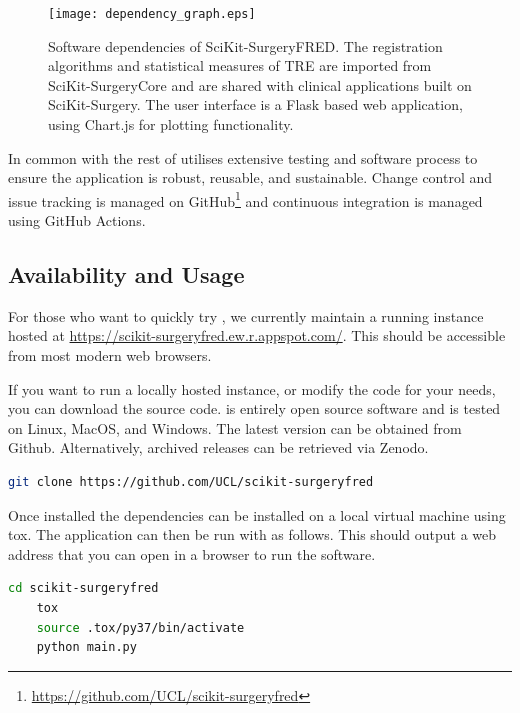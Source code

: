 \begin{figure}
	\begin{center}
	\texttt{[image: dependency\_graph.eps]}
		\caption{\label{fig:dependencies}Software dependencies of SciKit-SurgeryFRED. The registration algorithms and statistical measures of {TRE} are imported from SciKit-SurgeryCore and are shared with clinical applications built on SciKit-Surgery. The user interface is a Flask based web application, using Chart.js for plotting functionality.}
	\end{center}
\end{figure}

In common with the rest of \sksurgery \fred utilises extensive testing and software process \cite{1398621} to 
ensure the application is robust, reusable, and sustainable\cite{VENTERS2018174}. Change control and issue tracking is managed
on GitHub\footnote{\href{https://github.com/UCL/scikit-surgeryfred}{https://github.com/UCL/scikit-surgeryfred}} and continuous integration is managed using
GitHub Actions.

\subsection{Availability and Usage}
For those who want to quickly try \fredns, we currently maintain a running instance hosted at \href{https://scikit-surgeryfred.ew.r.appspot.com/}{https://scikit-surgeryfred.ew.r.appspot.com/}. This should be accessible from most modern web browsers.

If you want to run a locally hosted instance, or modify the code for your needs, you can download the source code. \fred is entirely open source software and is tested on Linux, MacOS, and Windows. The latest version can be obtained from Github. Alternatively, archived releases can be retrieved via Zenodo\cite{stephen_thompson_2021_4452867}.

\begin{lstlisting}[language=bash]
	git clone https://github.com/UCL/scikit-surgeryfred
\end{lstlisting}

Once installed the dependencies can be installed on a local virtual machine using tox. The application can then be run with as follows. This should output a web address that you can open in a browser to run the software. 

\begin{lstlisting}[language=bash]
	cd scikit-surgeryfred
	tox
	source .tox/py37/bin/activate
	python main.py
\end{lstlisting}

